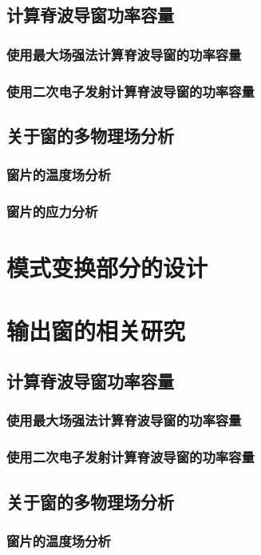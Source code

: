 \documentclass[master]{thesis-uestc}
\begin{document}
\subsection{计算脊波导窗功率容量}
\subsubsection{使用最大场强法计算脊波导窗的功率容量}
\subsubsection{使用二次电子发射计算脊波导窗的功率容量}
\subsection{关于窗的多物理场分析}
\subsubsection{窗片的温度场分析}
\subsubsection{窗片的应力分析}
\section{模式变换部分的设计}
\section{输出窗的相关研究}

\subsection{计算脊波导窗功率容量}
\subsubsection{使用最大场强法计算脊波导窗的功率容量}
\subsubsection{使用二次电子发射计算脊波导窗的功率容量}
\subsection{关于窗的多物理场分析}
\subsubsection{窗片的温度场分析}
\end{document}
